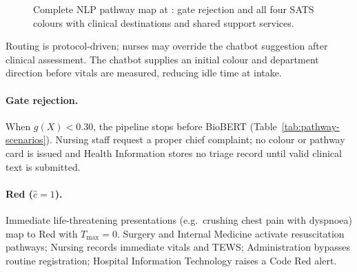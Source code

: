 \begin{figure}[H]
{}
\caption{Complete NLP pathway map at \examplehospital{}: gate rejection and all four SATS colours with clinical destinations and shared support services.}
\label{fig:pathway-map}
\end{figure}

\begin{remark}
Routing is protocol-driven; nurses may override the chatbot suggestion after clinical assessment. The chatbot supplies an initial colour and department direction before vitals are measured, reducing idle time at intake.
\end{remark}

\paragraph{Gate rejection.}
When \(g(X) < 0.30\), the pipeline stops before BioBERT (Table~\ref{tab:pathway-scenarios}). Nursing staff request a proper chief complaint; no colour or pathway card is issued and Health Information stores no triage record until valid clinical text is submitted.

\paragraph{Red (\(\hat{c}=1\)).}
Immediate life-threatening presentations (e.g.\ crushing chest pain with dyspnoea) map to Red with \(T_{\max}=0\). Surgery and Internal Medicine activate resuscitation pathways; Nursing records immediate vitals and TEWS; Administration bypasses routine registration; Hospital Information Technology raises a Code Red alert.

